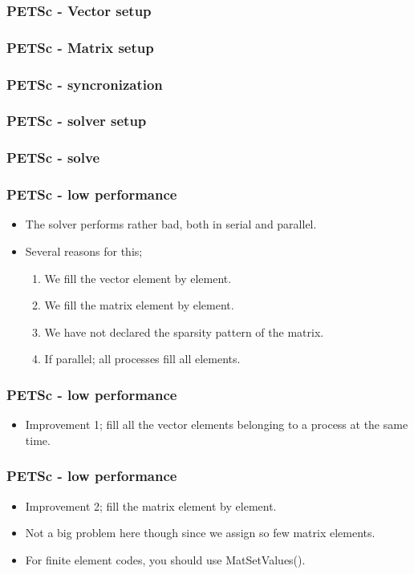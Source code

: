 \documentclass{beamer}
\begin{document}
\begin{frame}\frametitle{PETSc - Vector setup}
  
\end{frame}

\begin{frame}\frametitle{PETSc - Matrix setup}
  
\end{frame}
\begin{frame}\frametitle{PETSc - syncronization}
  
\end{frame}
\begin{frame}\frametitle{PETSc - solver setup}
  
\end{frame}
\begin{frame}\frametitle{PETSc - solve}
  
\end{frame}
\begin{frame}\frametitle{PETSc - low performance}
  \begin{itemize}
    \item The solver performs rather bad, both in serial and parallel.
    \item Several reasons for this;
        \begin{enumerate}
          \item We fill the vector element by element.
          \item We fill the matrix element by element.
          \item We have not declared the sparsity pattern of the matrix.
          \item If parallel; all processes fill all elements.
        \end{enumerate}
  \end{itemize}
\end{frame}
\begin{frame}\frametitle{PETSc - low performance}
  \begin{itemize}
    \item Improvement 1; fill all the vector elements belonging to a process
          at the same time.
          
  \end{itemize}
\end{frame}
\begin{frame}\frametitle{PETSc - low performance}
  \begin{itemize}
    \item Improvement 2; fill the matrix element by element. 
    \item Not a big problem here though since we assign so few matrix elements.
    \item For finite element codes, you should use MatSetValues().
  \end{itemize}
\end{frame}
\end{document}
